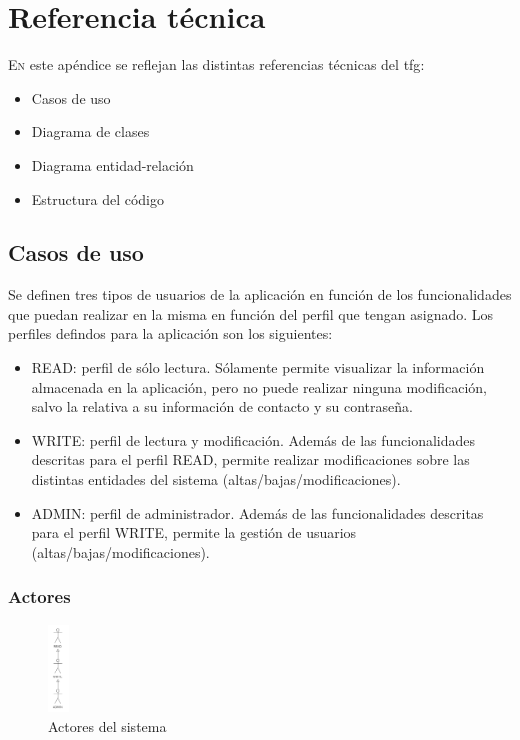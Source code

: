 \chapter{Referencia técnica}
\label{chap:ref-tecnica}

\lettrine{E}{n} este apéndice se reflejan las distintas referencias técnicas del \acrshort{tfg}:

\begin{itemize}
\item Casos de uso
\item Diagrama de clases
\item Diagrama entidad-relación
\item Estructura del código
\end{itemize}

\section{Casos de uso}
\label{chap:casos-uso}

Se definen tres tipos de usuarios de la aplicación en función de los funcionalidades que puedan realizar en la misma en función del perfil que tengan asignado. Los perfiles defindos para la aplicación son los siguientes:

\begin{itemize}
\item READ: perfil de sólo lectura. Sólamente permite visualizar la información almacenada en la aplicación, pero no puede realizar ninguna modificación, salvo la relativa a su información de contacto y su contraseña.
\item WRITE: perfil de lectura y modificación. Además de las funcionalidades descritas para el perfil READ, permite realizar modificaciones sobre las distintas entidades del sistema (altas/bajas/modificaciones).
\item ADMIN: perfil de administrador. Además de las funcionalidades descritas para el perfil WRITE, permite la gestión de usuarios (altas/bajas/modificaciones).
\end{itemize}


\subsection{Actores}
\label{sub:actores}


\begin{figure}[hp!]
  \centering
  \includegraphics[width=0.05\textwidth]{imaxes/actores.png}
  \caption{Actores del sistema}
  \label{fig:actores}
\end{figure}

